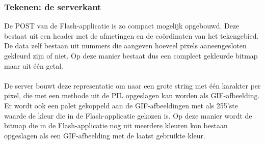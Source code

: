 \subsubsection{Tekenen: de serverkant}
De POST van de Flash-applicatie is zo compact mogelijk opgebouwd. 
Deze bestaat uit een header met de afmetingen en de co\"{o}rdinaten van het tekengebied. 
De data zelf bestaan uit nummers die aangeven hoeveel pixels aaneengesloten gekleurd zijn of niet. 
Op deze manier bestaat dus een compleet gekleurde bitmap maar uit \'{e}\'{e}n getal.
\\
\\
De server bouwt deze representatie om naar een grote string met \'{e}\'{e}n karakter per pixel, die met een methode uit de PIL opgeslagen kan worden als GIF-afbeelding. 
Er wordt ook een palet gekoppeld aan de GIF-afbeeldingen met als 255'ste waarde de kleur die in de Flash-applicatie gekozen is. 
Op deze manier wordt de bitmap die in de Flash-applicatie nog uit meerdere kleuren kon bestaan opgeslagen als een GIF-afbeelding met de laatst gebruikte kleur.
